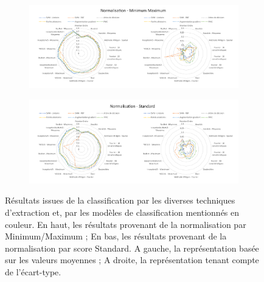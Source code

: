 \begin{figure}[H]
    \centering
    
    \begin{subfigure}{\textwidth}
      \includegraphics[width=\textwidth]{contents/chapter_4/resources/results_image_classification_mms.pdf}
    \end{subfigure}
    
    \begin{subfigure}{\textwidth}
      \includegraphics[width=\textwidth]{contents/chapter_4/resources/results_image_classification_ss.pdf}
    \end{subfigure}
    
    \caption{Résultats issues de la classification par les diverses techniques d'extraction et, par les modèles de classification mentionnés en couleur. En haut, les résultats provenant de la normalisation par Minimum/Maximum ; En bas, les résultats provenant de la normalisation par score Standard. A gauche, la représentation basée sur les valeurs moyennes ; A droite, la représentation tenant compte de l'écart-type.}
    \label{fig:results_image_classification}
\end{figure}\par

